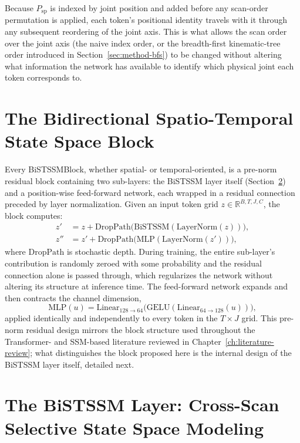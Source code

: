 Because $P_{\mathrm{sp}}$ is indexed by joint position and added before
any scan-order permutation is applied, each token's positional identity
travels with it through any subsequent reordering of the joint axis. This
is what allows the scan order over the joint axis (the naive index order,
or the breadth-first kinematic-tree order introduced in
Section~\ref{sec:method-bfs}) to be changed without altering what
information the network has available to identify which physical joint
each token corresponds to.

\section{The Bidirectional Spatio-Temporal State Space Block}
\label{sec:method-block}

Every BiSTSSMBlock, whether spatial- or temporal-oriented, is a pre-norm
residual block containing two sub-layers: the BiSTSSM layer itself
(Section~\ref{sec:method-bistssm}) and a position-wise feed-forward
network, each wrapped in a residual connection preceded by layer
normalization. Given an input token grid $z \in \mathbb{R}^{B,T,J,C}$, the
block computes:
\begin{align}
z' &= z + \mathrm{DropPath}\big(\mathrm{BiSTSSM}(\mathrm{LayerNorm}(z))\big), \\
z'' &= z' + \mathrm{DropPath}\big(\mathrm{MLP}(\mathrm{LayerNorm}(z'))\big),
\end{align}
where $\mathrm{DropPath}$ is stochastic depth. During training, the
entire sub-layer's contribution is randomly zeroed with some probability
and the residual connection alone is passed through, which regularizes the
network without altering its structure at inference time. The
feed-forward network expands and then contracts the channel dimension,
\begin{equation}
\mathrm{MLP}(u) = \mathrm{Linear}_{128 \rightarrow 64}\big(\mathrm{GELU}(\mathrm{Linear}_{64 \rightarrow 128}(u))\big),
\end{equation}
applied identically and independently to every token in the $T \times J$
grid. This pre-norm residual design mirrors the block structure used
throughout the Transformer- and SSM-based literature reviewed in
Chapter~\ref{ch:literature-review}; what distinguishes the block proposed
here is the internal design of the BiSTSSM layer itself, detailed next.

\section{The BiSTSSM Layer: Cross-Scan Selective State Space Modeling}
\label{sec:method-bistssm}

